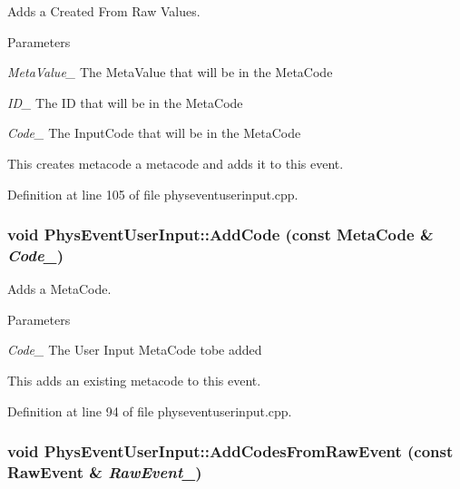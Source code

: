 Adds a Created From Raw Values. 
\begin{DoxyParams}{Parameters}
\item[{\em MetaValue\_\-}]The MetaValue that will be in the MetaCode \item[{\em ID\_\-}]The ID that will be in the MetaCode \item[{\em Code\_\-}]The InputCode that will be in the MetaCode\end{DoxyParams}
This creates metacode a metacode and adds it to this event. 

Definition at line 105 of file physeventuserinput.cpp.\hypertarget{classPhysEventUserInput_a4f5b94c64cd08c15b480e441d25a385d}{
\subsubsection[{AddCode}]{\setlength{\rightskip}{0pt plus 5cm}void PhysEventUserInput::AddCode (const {\bf MetaCode} \& {\em Code\_\-})}}
\label{dc/d0e/classPhysEventUserInput_a4f5b94c64cd08c15b480e441d25a385d}


Adds a MetaCode. 
\begin{DoxyParams}{Parameters}
\item[{\em Code\_\-}]The User Input MetaCode tobe added\end{DoxyParams}
This adds an existing metacode to this event. 

Definition at line 94 of file physeventuserinput.cpp.\hypertarget{classPhysEventUserInput_a9e42f42f9a4a42f792e5cf95856669c0}{
\subsubsection[{AddCodesFromRawEvent}]{\setlength{\rightskip}{0pt plus 5cm}void PhysEventUserInput::AddCodesFromRawEvent (const RawEvent \& {\em RawEvent\_\-})}}
\label{dc/d0e/classPhysEventUserInput_a9e42f42f9a4a42f792e5cf95856669c0}


